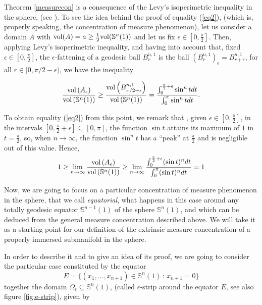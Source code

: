 \documentclass{amsart}
\theoremstyle{definition}
\theoremstyle{remark}
\begin{document}
 Theorem \ref{measurecon} is a consequence of the Levy's isoperimetric inequality in the sphere, (see \cite{MS}).
  To see the idea behind the proof of equality (\ref{eq2}), (which is, properly speaking, the concentration of measure phenomenon), let us consider a  domain $A$ with ${\rm vol }(A)=a \geq \frac{1}{2} {\rm vol}(\mathbb{S}^n(1))$ and let us fix $\epsilon \in [0,\frac{\pi}{2}]$. Then,  applying Levy's isoperimetric inequality, and having into account that, fixed $\epsilon \in [0,\frac{\pi}{2}]$, the $\epsilon$-fattening of a geodesic ball $B^{n,1}_{r}$ is the ball $(B^{n,1}_{r})_{\epsilon}=B^{n,1}_{r+\epsilon}$, for all $r \in [0,\pi/2-\epsilon)$, we have the inequality

\begin{equation}
\frac{{\rm vol}\left(A_\epsilon\right)}{{\rm vol}\left(\mathbb{S}^n(1)\right)}\geq  \frac{{\rm vol}\left(B^{n,1}_{\pi/2+\epsilon}\right)}{{\rm vol}\left(\mathbb{S}^n(1)\right)}= \frac{\int _0^{\frac{\pi}{2}+\epsilon} \sin^n t dt }{\int _0^\pi \sin^n t dt   }.
\end{equation}

To obtain equality (\ref{eq2}) from this point, we remark that , given $\epsilon \in [0,\frac{\pi}{2}]$,  in the intervals $[0, \frac{\pi}{2}+\epsilon] \subseteq [0,\pi]$, the function $\sin t$ attains its maximum of $1$ in $t=\frac{\pi}{2}$, so, when $n \to \infty$, the function $\sin^n t$ has a ``peak'' at $\frac{\pi}{2}$ and is negligible out of this value. Hence, 
\begin{equation}
1\geq \lim_{n \to \infty} \frac{{\rm vol}\left(A_\epsilon\right)}{{\rm vol}\left(\mathbb{S}^n(1)\right)}\geq  \lim_{n \to \infty} \frac{\int _0^{\frac{\pi}{2}+\epsilon} (\sin t)^n dt }{\int _0^\pi (\sin t)^n dt   }=1
\end{equation}
\medskip

Now, we are going to focus on a particular concentration of measure phenomenon in the sphere, that we call {\em equatorial}, what happens in this case around any totally geodesic equator $\mathbb{S}^{n-1}(1)$ of the sphere $ \mathbb{S}^{n}(1)$, and which can be deduced from the general measure concentration described above. We will take  it as  a starting point for our definition of the extrinsic measure concentration of a properly immersed submanifold in the sphere.

In order to describe it and to give an idea of its proof, we are going to consider the particular case constituted by the equator 
$$E=\{(x_1,\ldots,x_{n+1})\in \mathbb{S}^{n}(1)\, :\, x_{n+1}=0\}$$
together the domain $\Omega_\epsilon \subseteq  \mathbb{S}^{n}(1) $, (called $\epsilon$-strip around the equator $E$, see also figure \ref{fig:e-strip}), given by
\end{document}
